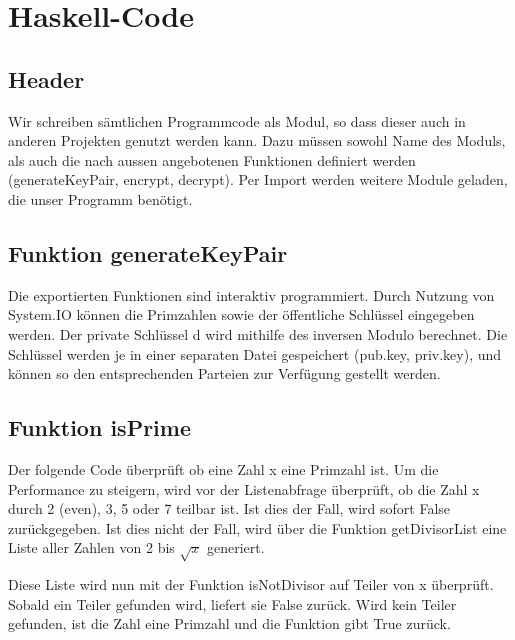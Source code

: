 \documentclass[a4paper, 11pt]{article} %
\begin{document}
\section{Haskell-Code}
\subsection{Header}
Wir schreiben sämtlichen Programmcode als Modul, so dass dieser auch in anderen Projekten genutzt werden kann. Dazu müssen sowohl Name des Moduls, als auch die nach aussen angebotenen Funktionen definiert werden (generateKeyPair, encrypt, decrypt). Per Import werden weitere Module geladen, die unser Programm benötigt.


\subsection{Funktion generateKeyPair}
Die exportierten Funktionen sind interaktiv programmiert. Durch Nutzung von System.IO können die Primzahlen sowie der öffentliche Schlüssel eingegeben werden. Der private Schlüssel d wird mithilfe des inversen Modulo berechnet.
Die Schlüssel werden je in einer separaten Datei gespeichert (pub.key, priv.key), und können so den entsprechenden Parteien zur Verfügung gestellt werden.




\subsection{Funktion isPrime}
Der folgende Code überprüft ob eine Zahl x eine Primzahl ist. Um die Performance zu steigern, wird vor der Listenabfrage überprüft, ob die Zahl x durch 2 (even), 3, 5 oder 7 teilbar ist. Ist dies der Fall, wird sofort False zurückgegeben.
Ist dies nicht der Fall, wird über die Funktion getDivisorList eine Liste aller Zahlen von 2 bis $\sqrt{x}$ generiert.

Diese Liste wird nun mit der Funktion isNotDivisor auf Teiler von x überprüft. Sobald ein Teiler gefunden wird, liefert sie False zurück. Wird kein Teiler gefunden, ist die Zahl eine Primzahl und die Funktion gibt True zurück.

\end{document}
